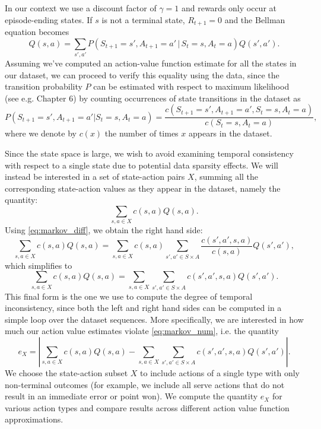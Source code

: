 \documentclass{sfuthesis}
\begin{document}
	In our context we use a discount factor of $\gamma = 1$ and rewards only occur at episode-ending states. If $s$ is not a terminal state, $R_{t+1} = 0$ and the Bellman equation becomes
	\begin{equation}
		Q(s,a) = \sum_{s',a'} P(S_{t+1} = s', A_{t+1} = a' \, | \, S_t = s, A_t = a) Q(s',a').
		\label{eq:markov_diff}
	\end{equation}
	Assuming we've computed an action-value function estimate for all the states in our dataset, we can proceed to verify this equality using the data, since the transition probability $P$ can be estimated with respect to maximum likelihood (see e.g. \cite{sutton2018reinforcement} Chapter 6) by counting occurrences of state transitions in the dataset as
	$$P(S_{t+1} = s', A_{t+1} = a' | S_t = s, A_t = a) = \frac{c(S_{t+1} = s', A_{t+1} = a', S_t = s, A_t = a)}{c(S_t = s, A_t = a)},$$
	where we denote by $c(x)$ the number of times $x$ appears in the dataset.
	
	Since the state space is large, we wish to avoid examining temporal consistency with respect to a single state due to potential data sparsity effects. We will instead be interested in a set of state-action pairs $X$, summing all the corresponding state-action values as they appear in the dataset, namely the quantity:
	$$\sum_{s,a\in X} c(s,a)Q(s,a).$$
	Using \eqref{eq:markov_diff}, we obtain the right hand side:
	\begin{equation}
		\sum_{s,a\in X} c(s,a)Q(s,a) = \sum_{s,a\in X} c(s,a)\sum_{s',a'\in S\times A} \frac{c(s',a',s,a)}{c(s,a)} Q(s',a'),
	\end{equation}
	which simplifies to
	\begin{equation}
		\sum_{s,a\in X} c(s,a)Q(s,a) = \sum_{s,a\in X} \sum_{s',a'\in S\times A} c(s',a',s,a) Q(s',a').
		\label{eq:markov_num}
	\end{equation}
	This final form is the one we use to compute the degree of temporal inconsistency, since both the left and right hand sides can be computed in a simple loop over the dataset sequences. More specifically, we are interested in how much our action value estimates violate \eqref{eq:markov_num}, i.e. the quantity
	\begin{equation}
		e_X = |\sum_{s,a\in X} c(s,a)Q(s,a) - \sum_{s,a\in X} \sum_{s',a'\in S\times A} c(s',a',s,a) Q(s',a') |.
		\label{eq:markov_num2}
	\end{equation}
	We choose the state-action subset $X$ to include actions of a single type with only non-terminal outcomes (for example, we include all serve actions that do not result in an immediate error or point won). We compute the quantity $e_X$ for various action types and compare results across different action value function approximations.
	
\end{document}
